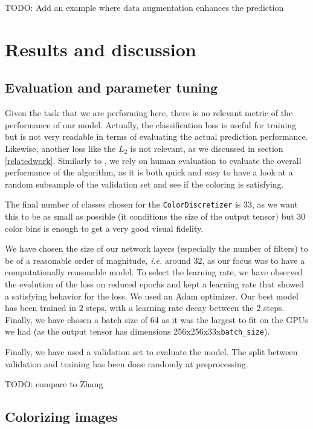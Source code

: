 \documentclass[10pt,twocolumn,letterpaper]{article}
\begin{document}
TODO: Add an example where data augmentation enhances the prediction

\section{Results and discussion}
\subsection{Evaluation and parameter tuning}

Given the task that we are performing here, there is no relevant metric of the performance of our model. Actually, the classification loss is useful for training but is not very readable in terms of evaluating the actual prediction performance. Likewise, another loss like the $L_2$ is not relevant, as we discussed in section \ref{relatedwork}. Similarly to \cite{zhang2016colorful}, we rely on human evaluation to evaluate the overall performance of the algorithm, as it is both quick and easy to have a look at a random subsample of the validation set and see if the coloring is satisfying.

The final number of classes chosen for the \texttt{ColorDiscretizer} is 33, as we want this to be as small as possible (it conditions the size of the output tensor) but 30 color bins is enough to get a very good visual fidelity.

We have chosen the size of our network layers (especially the number of filters) to be of a reasonable order of magnitude, \textit{i.e.} around 32, as our focus was to have a computationally reasonable model. To select the learning rate, we have observed the evolution of the loss on reduced epochs and kept a learning rate that showed a satisfying behavior for the loss. We used an Adam optimizer. Our best model has been trained in 2 steps, with a learning rate decay between the 2 steps. Finally, we have chosen a batch size of 64 as it was the largest to fit on the GPUs we had (as the output tensor has dimensions 256x256x33x\texttt{batch\_size}).
 
Finally, we have used a validation set to evaluate the model. The split between validation and training  has been done randomly at preprocessing. 

TODO: compare to Zhang \cite{zhang2016colorful}

\subsection{Colorizing images}
\end{document}
